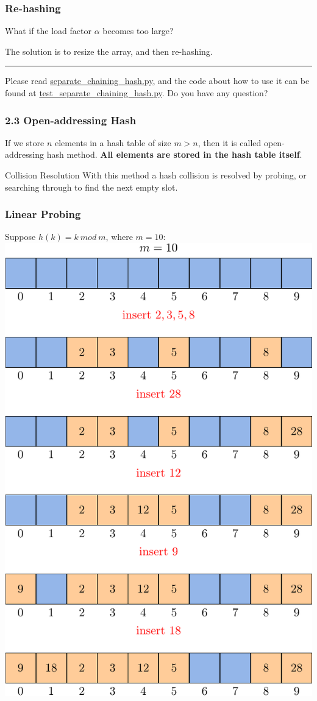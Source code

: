 \documentclass[aspectratio=169, 14pt]{beamer}
\begin{document}
\begin{frame}
    \frametitle{Re-hashing}
 What if the load factor $\alpha$ becomes too large?
    
The solution is to resize the array, and then \alert{re-hashing}.

\par\noindent\rule{\textwidth}{0.4pt}

 Please read \href{https://github.com/ChenZhongPu/data-structure-swufe/blob/master/code/python/hash/separate_chaining_hash.py}{separate\_chaining\_hash.py}, and the code about how to use it can be found at \href{https://github.com/ChenZhongPu/data-structure-swufe/blob/master/code/python/hash/test_separate_chaining_hash.py}{test\_separate\_chaining\_hash.py}. Do you have any question?

\end{frame}

\begin{frame}
    \frametitle{2.3 Open-addressing Hash}
If we store $n$ elements in a hash table of size $m > n$, then it is called \alert{open-addressing} hash method. \textbf{All elements are stored in the hash table itself}.

\begin{block}{Collision Resolution}
With this method a hash collision is resolved by \alert{probing}, or searching through to find the next empty slot.
\end{block}

\end{frame}

\begin{frame}
    \frametitle{Linear Probing}
Suppose $h(k) = k \ mod \ m$, where $m = 10$:
\includegraphics[width=.7\textwidth, trim={0 12cm 0 0},clip]{week11/probe}

\end{frame}
\end{document}
